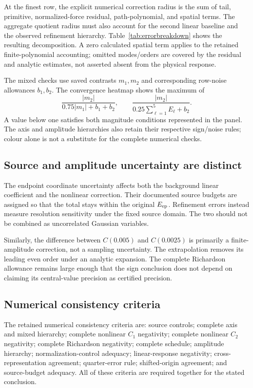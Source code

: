 At the finest row, the explicit numerical correction radius is the sum of tail, primitive, normalized-force residual, path-polynomial, and spatial terms. The aggregate quotient radius must also account for the second linear baseline and the observed refinement hierarchy. Table~\ref{tab:errorbreakdown} shows the resulting decomposition. A zero calculated spatial term applies to the retained finite-polynomial accounting; omitted modes/orders are covered by the residual and analytic estimates, not asserted absent from the physical response.



The mixed checks use saved contrasts $m_1,m_2$ and corresponding row-noise allowances $b_1,b_2$. The convergence heatmap shows the maximum of
\begin{equation}
 \frac{|m_2|}{0.75|m_1|+b_1+b_2},\qquad
 \frac{|m_2|}{0.25\sum_{\ell=1}^5E_\ell+b_2}.
\end{equation}
A value below one satisfies both magnitude conditions represented in the panel. The axis and amplitude hierarchies also retain their respective sign/noise rules; colour alone is not a substitute for the complete numerical checks.

\subsection{Source and amplitude uncertainty are distinct}
The endpoint coordinate uncertainty affects both the background linear coefficient and the nonlinear correction. Their documented source budgets are assigned so that the total stays within the original $E_{\mathrm{ep}}$. Refinement errors instead measure resolution sensitivity under the fixed source domain. The two should not be combined as uncorrelated Gaussian variables.

Similarly, the difference between $C(0.005)$ and $C(0.0025)$ is primarily a finite-amplitude correction, not a sampling uncertainty. The extrapolation removes its leading even order under an analytic expansion. The complete Richardson allowance remains large enough that the sign conclusion does not depend on claiming its central-value precision as certified precision.

\subsection{Numerical consistency criteria}
The retained numerical consistency criteria are: source controls; complete axis and mixed hierarchy; complete nonlinear $C_1$ negativity; complete nonlinear $C_2$ negativity; complete Richardson negativity; complete schedule; amplitude hierarchy; normalization-control adequacy; linear-response negativity; cross-representation agreement; quarter-error rule; shifted-origin agreement; and source-budget adequacy. All of these criteria are required together for the stated conclusion. 

